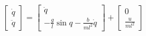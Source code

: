 \documentclass[preview]{standalone}
\begin{document}
\begin{align*}
\begin{bmatrix}\dot{q} \\ \ddot{q}\end{bmatrix} = \begin{bmatrix}\dot{q} \\ -\frac{g}{l}\sin{q}-\frac{b}{ml^2}\dot{q}\end{bmatrix} + \begin{bmatrix}0 \\ \frac{u}{ml^2}\end{bmatrix}
\end{align*}
\end{document}
